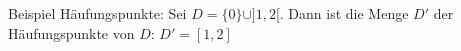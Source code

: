 \begin{example}
    Beispiel Häufungspunkte: Sei $D = \{0\} \cup ]1,2[$. Dann ist die Menge $D'$ der Häufungspunkte von $D$: $D'= [1,2]$
\end{example}